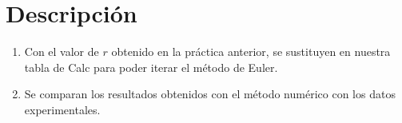 \section{Descripción}

\begin{enumerate}
    \item Con el valor de $r$ obtenido en la práctica anterior,
        se sustituyen en nuestra tabla de Calc para poder
        iterar el método de Euler.
    \item Se comparan los resultados obtenidos con el método
        numérico con los datos experimentales.
\end{enumerate}
